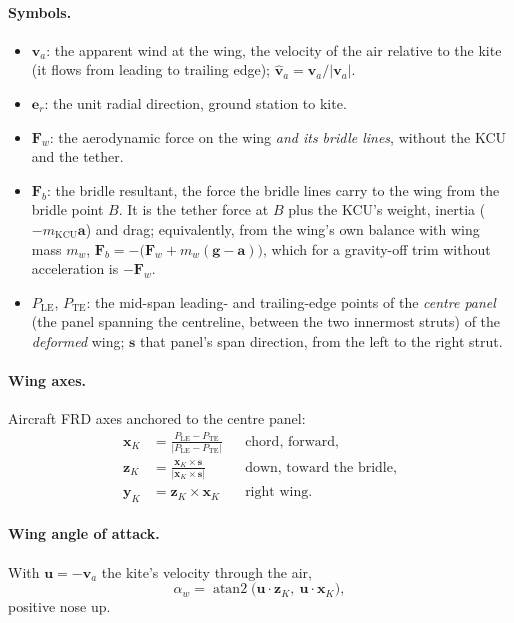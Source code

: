 \documentclass[11pt,a4paper]{article}
\begin{document}
\paragraph{Symbols.}
\begin{itemize}
  \item $\mathbf v_a$: the apparent wind at the wing, the velocity of the air
        relative to the kite (it flows from leading to trailing edge);
        $\hat{\mathbf v}_a=\mathbf v_a/|\mathbf v_a|$.
  \item $\mathbf e_r$: the unit radial direction, ground station to kite.
  \item $\mathbf F_w$: the aerodynamic force on the wing \emph{and its bridle
        lines}, without the KCU and the tether.
  \item $\mathbf F_b$: the bridle resultant, the force the bridle lines carry
        to the wing from the bridle point $B$. It is the tether force at $B$
        plus the KCU's weight, inertia ($-m_\mathrm{KCU}\mathbf a$) and drag;
        equivalently, from the wing's own balance with wing mass $m_w$,
        $\mathbf F_b=-\bigl(\mathbf F_w+m_w(\mathbf g-\mathbf a)\bigr)$, which
        for a gravity-off trim without acceleration is $-\mathbf F_w$.
  \item $P_\mathrm{LE}$, $P_\mathrm{TE}$: the mid-span leading- and
        trailing-edge points of the \emph{centre panel} (the panel spanning
        the centreline, between the two innermost struts) of the
        \emph{deformed} wing; $\mathbf s$ that panel's span direction, from
        the left to the right strut.
\end{itemize}

\paragraph{Wing axes.} Aircraft FRD axes anchored to the centre panel:
\begin{align}
  \mathbf x_K&=\frac{P_\mathrm{LE}-P_\mathrm{TE}}{|P_\mathrm{LE}-P_\mathrm{TE}|} && \text{chord, forward},\nonumber\\
  \mathbf z_K&=\frac{\mathbf x_K\times\mathbf s}{|\mathbf x_K\times\mathbf s|} && \text{down, toward the bridle},\\
  \mathbf y_K&=\mathbf z_K\times\mathbf x_K && \text{right wing}.\nonumber
\end{align}

\paragraph{Wing angle of attack.} With $\mathbf u=-\mathbf v_a$ the kite's
velocity through the air,
\begin{equation}
  \alpha_w=\operatorname{atan2}\bigl(\mathbf u\cdot\mathbf z_K,\ \mathbf u\cdot\mathbf x_K\bigr),
  \label{eq:alpha-w}
\end{equation}
positive nose up.
\end{document}
